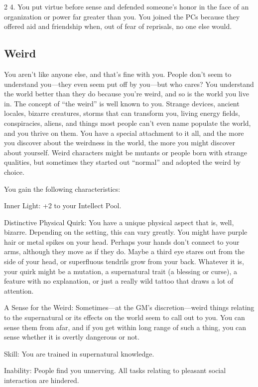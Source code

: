 \begin{multicols}{2}
4. You put virtue before sense and defended someone’s honor in the face of an organization or power far greater than you. You joined the PCs because they offered aid and friendship when, out of fear of reprisals, no one else would.

\subsection{Weird}

You aren’t like anyone else, and that’s fine with you. People don’t seem to understand you—they even seem put off by you—but who cares? You understand the world better than they do because you’re weird, and so is the world you live in. The concept of “the weird” is well known to you. Strange devices, ancient locales, bizarre creatures, storms that can transform you, living energy fields, conspiracies, aliens, and things most people can’t even name populate the world, and you thrive on them. You have a special attachment to it all, and the more you discover about the weirdness in the world, the more you might discover about yourself.
Weird characters might be mutants or people born with strange qualities, but sometimes they started out “normal” and adopted the weird by choice.

You gain the following characteristics:

Inner Light: +2 to your Intellect Pool.

Distinctive Physical Quirk: You have a unique physical aspect that is, well, bizarre. Depending on the setting, this can vary greatly. You might have purple hair or metal spikes on your head. Perhaps your hands don’t connect to your arms, although they move as if they do. Maybe a third eye stares out from the side of your head, or superfluous tendrils grow from your back. Whatever it is, your quirk might be a mutation, a supernatural trait (a blessing or curse), a feature with no explanation, or just a really wild tattoo that draws a lot of attention.

A Sense for the Weird: Sometimes—at the GM’s discretion—weird things relating to the supernatural or its effects on the world seem to call out to you. You can sense them from afar, and if you get within long range of such a thing, you can sense whether it is overtly dangerous or not.

Skill: You are trained in supernatural knowledge.

Inability: People find you unnerving. All tasks relating to pleasant social interaction are hindered.


\end{multicols}

